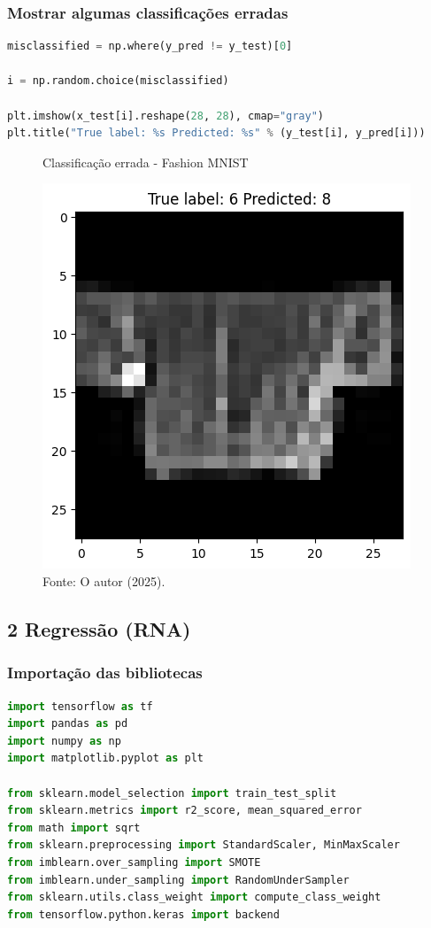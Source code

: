 \subsubsection*{Mostrar algumas classificações erradas}
\begin{lstlisting}[language=Python, style=input]
misclassified = np.where(y_pred != y_test)[0]

i = np.random.choice(misclassified)

plt.imshow(x_test[i].reshape(28, 28), cmap="gray")
plt.title("True label: %s Predicted: %s" % (y_test[i], y_pred[i]))
\end{lstlisting}
\begin{figure}[H]
\centering
\caption{Classificação errada - Fashion MNIST}
\includegraphics[width=.6\linewidth]{apendices/fig/13_IAA012_4.png}
\caption*{Fonte: O autor (2025).}
\end{figure}

\subsection*{\textbf{2 Regressão (RNA)}}
\subsubsection*{Importação das bibliotecas}
\begin{lstlisting}[language=Python, style=input]
import tensorflow as tf
import pandas as pd
import numpy as np
import matplotlib.pyplot as plt

from sklearn.model_selection import train_test_split
from sklearn.metrics import r2_score, mean_squared_error
from math import sqrt
from sklearn.preprocessing import StandardScaler, MinMaxScaler
from imblearn.over_sampling import SMOTE
from imblearn.under_sampling import RandomUnderSampler
from sklearn.utils.class_weight import compute_class_weight
from tensorflow.python.keras import backend
\end{lstlisting}
